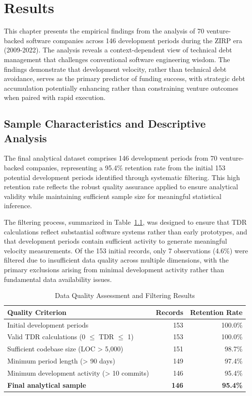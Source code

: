 \chapter{Results}\label{sec:results}

This chapter presents the empirical findings from the analysis of 70 venture-backed software companies across 146 development periods during the \ac{ZIRP} era (2009-2022). The analysis reveals a context-dependent view of technical debt management that challenges conventional software engineering wisdom. The findings demonstrate that development velocity, rather than technical debt avoidance, serves as the primary predictor of funding success, with strategic debt accumulation potentially enhancing rather than constraining venture outcomes when paired with rapid execution.

\section{Sample Characteristics and Descriptive Analysis}\label{sec:sample_characteristics}

The final analytical dataset comprises 146 development periods from 70 venture-backed companies, representing a 95.4\% retention rate from the initial 153 potential development periods identified through systematic filtering. This high retention rate reflects the robust quality assurance applied to ensure analytical validity while maintaining sufficient sample size for meaningful statistical inference.

The filtering process, summarized in Table~\ref{tab:data_quality}, was designed to ensure that \ac{TDR} calculations reflect substantial software systems rather than early prototypes, and that development periods contain sufficient activity to generate meaningful velocity measurements. Of the 153 initial records, only 7 observations (4.6\%) were filtered due to insufficient data quality across multiple dimensions, with the primary exclusions arising from minimal development activity rather than fundamental data availability issues.

\begin{table}[htbp]
\centering
\caption{Data Quality Assessment and Filtering Results}
\label{tab:data_quality}
\begin{tabular}{lrr}
\hline
\textbf{Quality Criterion} & \textbf{Records} & \textbf{Retention Rate} \\
\hline
Initial development periods & 153 & 100.0\% \\
Valid TDR calculations (0 $\le$ TDR $\le$ 1) & 153 & 100.0\% \\
Sufficient codebase size (LOC > 5,000) & 151 & 98.7\% \\
Minimum period length (> 90 days) & 149 & 97.4\% \\
Minimum development activity (> 10 commits) & 146 & 95.4\% \\
\hline
\textbf{Final analytical sample} & \textbf{146} & \textbf{95.4\%} \\
\hline
\end{tabular}
\end{table}

